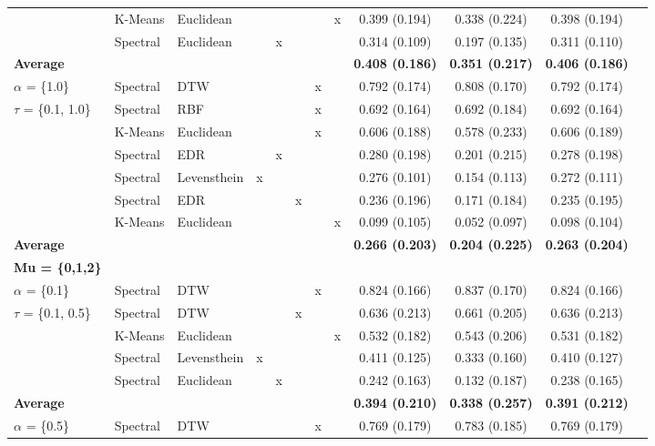 \begin{table}[!htbp]
{\begin{tabular}{@{\extracolsep{0pt}} lllccccccccc}
			& K-Means & Euclidean &  &  &  &  & x & 0.399 (0.194)  & 0.338 (0.224) & 0.398 (0.194) \\ 
			& Spectral & Euclidean &  & x &  &  &  & 0.314 (0.109) & 0.197 (0.135) & 0.311 (0.110) \\ 
			\hline
			\textbf{Average} &  &  &  &  &  &  &  &   \textbf{0.408 (0.186)} &  \textbf{0.351 (0.217)} &  \textbf{0.406 (0.186)} \\ 
			\hline
			$\alpha$ = \{1.0\} & Spectral  & DTW &  &  &  & x &  & 0.792 (0.174) & 0.808 (0.170) & 0.792 (0.174) \\ 
			$\tau$ = \{0.1, 1.0\} & Spectral  & RBF &  &  &  & x &  & 0.692 (0.164) & 0.692 (0.184) & 0.692 (0.164) \\ 
			& K-Means & Euclidean  &  &  &  & x &  & 0.606 (0.188) & 0.578 (0.233) & 0.606 (0.189) \\ 
			& Spectral  & EDR &  & x &  &  &  & 0.280 (0.198) & 0.201 (0.215) & 0.278 (0.198) \\ 
			& Spectral  & Levensthein & x &  &  &  &  & 0.276 (0.101) & 0.154 (0.113) & 0.272 (0.111) \\ 
			& Spectral  & EDR &  &  & x &  &  & 0.236 (0.196) & 0.171 (0.184) & 0.235 (0.195) \\ 
			& K-Means & Euclidean  &  &  &  &  & x & 0.099 (0.105) & 0.052 (0.097) & 0.098 (0.104) \\ 
			\hline
			\textbf{Average} &  &  &  &  &  &  &  &   \textbf{0.266 (0.203)} &  \textbf{0.204 (0.225)} &  \textbf{0.263 (0.204)} \\ 
			\hline
			\textbf{Mu = \{0,1,2\}} &  &  &  &  &  &  &  &  &  &  \\ 
			\hline
			$\alpha$ =  \{0.1\} & Spectral & DTW &  &  &  & x &  & 0.824 (0.166) & 0.837 (0.170) & 0.824 (0.166) \\ 
			$\tau$ = 	\{0.1, 0.5\} & Spectral & DTW &  &  & x &  &  & 0.636 (0.213) & 0.661 (0.205) & 0.636 (0.213) \\ 
			& K-Means & Euclidean &  &  &  &  & x & 0.532 (0.182) & 0.543 (0.206) & 0.531 (0.182) \\ 
			& Spectral & Levensthein & x &  &  &  &  & 0.411 (0.125) & 0.333 (0.160) & 0.410 (0.127) \\ 
			& Spectral & Euclidean &  & x &  &  &  & 0.242 (0.163) & 0.132 (0.187) & 0.238 (0.165) \\ 
			\hline
			\textbf{Average} &  &  &  &  &  &  &  &  \textbf{0.394 (0.210)} &  \textbf{0.338 (0.257)} &  \textbf{0.391 (0.212)} \\ 
			\hline
			$\alpha$ = \{0.5\} & Spectral & DTW &  &  &  & x &  & 0.769 (0.179) & 0.783 (0.185) & 0.769 (0.179) \\ 

\end{tabular}}
\end{table}
